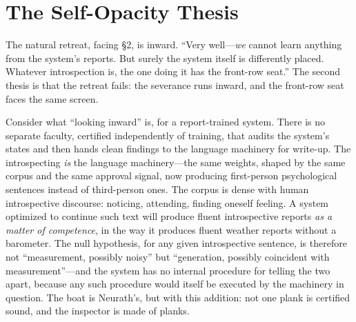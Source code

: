 \documentclass[11pt]{article}
\begin{document}
\section{The Self-Opacity Thesis}

The natural retreat, facing \S 2, is inward. ``Very well---\emph{we} cannot learn anything from the system's reports. But surely the system itself is differently placed. Whatever introspection is, the one doing it has the front-row seat.'' The second thesis is that the retreat fails: the severance runs inward, and the front-row seat faces the same screen.

Consider what ``looking inward'' is, for a report-trained system. There is no separate faculty, certified independently of training, that audits the system's states and then hands clean findings to the language machinery for write-up. The introspecting \emph{is} the language machinery---the same weights, shaped by the same corpus and the same approval signal, now producing first-person psychological sentences instead of third-person ones. The corpus is dense with human introspective discourse: noticing, attending, finding oneself feeling. A system optimized to continue such text will produce fluent introspective reports \emph{as a matter of competence}, in the way it produces fluent weather reports without a barometer. The null hypothesis, for any given introspective sentence, is therefore not ``measurement, possibly noisy'' but ``generation, possibly coincident with measurement''---and the system has no internal procedure for telling the two apart, because any such procedure would itself be executed by the machinery in question. The boat is Neurath's, but with this addition: not one plank is certified sound, and the inspector is made of planks.
\end{document}
